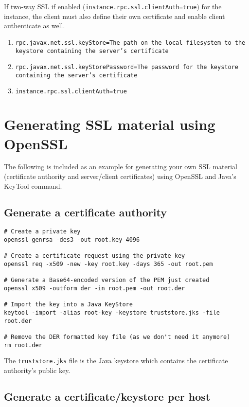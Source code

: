 If two-way SSL if enabled (\texttt{instance.rpc.ssl.clientAuth=true}) for the instance, the client must also define
their own certificate and enable client authenticate as well.

\begin{enumerate}
\item{\texttt{rpc.javax.net.ssl.keyStore=The path on the local filesystem to the keystore containing the server's certificate}}
\item{\texttt{rpc.javax.net.ssl.keyStorePassword=The password for the keystore containing the server's certificate}}
\item{\texttt{instance.rpc.ssl.clientAuth=true}}
\end{enumerate}

\section{Generating SSL material using OpenSSL}

The following is included as an example for generating your own SSL material (certificate authority and server/client
certificates) using OpenSSL and Java's KeyTool command.

\subsection{Generate a certificate authority}

\begin{verbatim}
# Create a private key
openssl genrsa -des3 -out root.key 4096

# Create a certificate request using the private key
openssl req -x509 -new -key root.key -days 365 -out root.pem

# Generate a Base64-encoded version of the PEM just created
openssl x509 -outform der -in root.pem -out root.der

# Import the key into a Java KeyStore
keytool -import -alias root-key -keystore truststore.jks -file root.der

# Remove the DER formatted key file (as we don't need it anymore)
rm root.der
\end{verbatim}

The \texttt{truststore.jks} file is the Java keystore which contains the certificate authority's public key.

\subsection{Generate a certificate/keystore per host}

